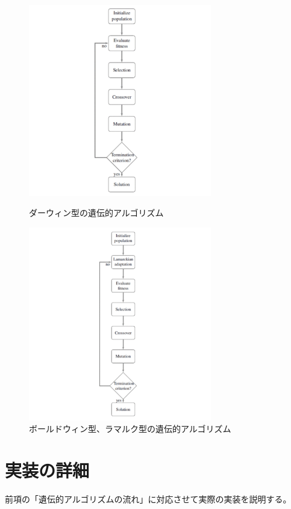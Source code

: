 \documentclass[uplatex]{jsarticle}
\begin{document}
  \begin{figure}[htbp]
  \begin{minipage}{0.5\hsize}
   \begin{center}
    \includegraphics[width=80mm]{darwin.png}
   \end{center}
   \caption{ダーウィン型の遺伝的アルゴリズム}
   \label{fig:one}
  \end{minipage}
  \begin{minipage}{0.5\hsize}
   \begin{center}
    \includegraphics[width=80mm]{baldwin.png}
   \end{center}
   \caption{ボールドウィン型、ラマルク型の遺伝的アルゴリズム}
   \label{fig:two}
  \end{minipage}
  \end{figure}

\section{実装の詳細}
前項の「遺伝的アルゴリズムの流れ」に対応させて実際の実装を説明する。
\end{document}

